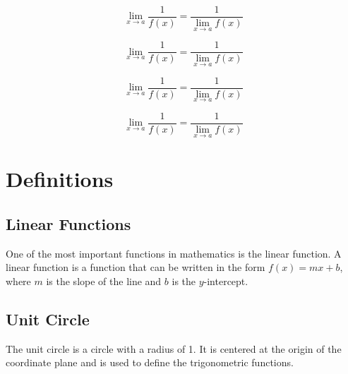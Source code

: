 \documentclass{book}
\begin{document}
\begin{equation}
    \lim_{x \to a} \frac{1}{f(x)} = \frac{1}{\lim_{x \to a} f(x)}
\end{equation}

\begin{equation}
    \lim_{x \to a} \frac{1}{f(x)} = \frac{1}{\lim_{x \to a} f(x)}
\end{equation}

\begin{equation}
    \lim_{x \to a} \frac{1}{f(x)} = \frac{1}{\lim_{x \to a} f(x)}
\end{equation}

\begin{equation}
    \lim_{x \to a} \frac{1}{f(x)} = \frac{1}{\lim_{x \to a} f(x)}
\end{equation}



\chapter{Definitions}
\section{Linear Functions}
One of the most important functions in mathematics is the linear function. A linear function is a function that can be written in the form $f(x) = mx + b$, where $m$ is the slope of the line and $b$ is the $y$-intercept.

\section{Unit Circle}
The unit circle is a circle with a radius of 1. It is centered at the origin of the coordinate plane and is used to define the trigonometric functions.
\end{document}
